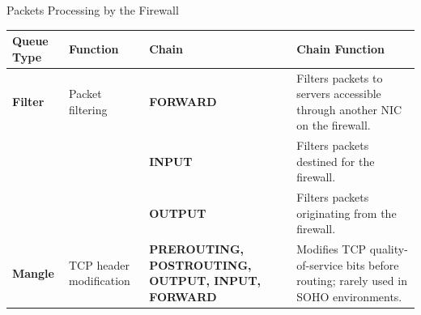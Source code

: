 \begin{frame}{Packets Processing by the Firewall}
\centering\fontsize{10.5}{12.5}\selectfont
\renewcommand{\arraystretch}{1.2}
\begin{tabular}{|Y{1.5cm}|Y{1.9cm}|Y{2.5cm}|Y{6.5cm}|}\hline
{}\color{white}\bfseries Queue Type&\color{white}\bfseries Function&\color{white}\bfseries Chain&\color{white}\bfseries Chain Function\\\hline
\textcolor{CommandGreen}{\bfseries Filter}&Packet filtering&\textcolor{WarningColor}{\bfseries FORWARD}&Filters packets to servers accessible through another NIC on the firewall.\\
&&\textcolor{WarningColor}{\bfseries INPUT}&Filters packets destined for the firewall.\\
&&\textcolor{WarningColor}{\bfseries OUTPUT}&Filters packets originating from the firewall.\\\hline
\textcolor{CommandGreen}{\bfseries Mangle}&TCP header modification&\textcolor{WarningColor}{\bfseries PREROUTING, POSTROUTING, OUTPUT, INPUT, FORWARD}&Modifies TCP quality-of-service bits before routing; rarely used in SOHO environments.\\\hline
\end{tabular}
\end{frame}
